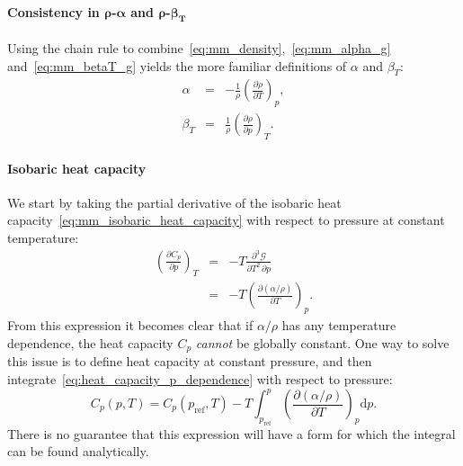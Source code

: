 \documentclass{article}
\begin{document}
\paragraph{Consistency in $\boldsymbol{\rho}$-$\boldsymbol{\alpha}$ and $\boldsymbol{\rho}$-$\boldsymbol{\beta_T}$}
Using the chain rule to combine~\eqref{eq:mm_density},~\eqref{eq:mm_alpha_g}
and~\eqref{eq:mm_betaT_g} yields the more familiar definitions of $\alpha$ and $\beta_T$:
\begin{eqnarray}
  \alpha &=& -\frac{1}{\rho} \left( \frac{\partial \rho}{\partial T} \right)_{p}, \label{eq:mm_thermal_expansivity} \\
  \beta_T &=& \frac{1}{\rho} \left( \frac{\partial \rho}{\partial p} \right)_{T}. \label{eq:mm_isothermal_compressibility}
\end{eqnarray}

\paragraph{Isobaric heat capacity}

We start by taking the partial derivative of the isobaric heat
capacity~\eqref{eq:mm_isobaric_heat_capacity} with respect to pressure at constant temperature:
\begin{eqnarray}
  \left( \frac{\partial C_p}{\partial p} \right)_{T} &=& -T \frac{\partial^3 \mathcal{G}}{\partial {T}^2 \, \partial {p}} \\
  &=& -T \left( \frac{\partial \left(\alpha / \rho \right)}{\partial T} \right)_{p}. \label{eq:heat_capacity_p_dependence}
\end{eqnarray}
From this expression it becomes clear that if $\alpha / \rho$ has any temperature dependence,
the heat capacity $C_p$ \emph{cannot} be globally constant. One way to solve this issue is to define
heat capacity at constant pressure, and then integrate~\eqref{eq:heat_capacity_p_dependence}
with respect to pressure:
\begin{equation}
  C_p(p, T)
  = C_p(p_{\textrm{ref}}, T) -T \int_{p_{\textrm{ref}}}^p
  \left(\frac{\partial \left(\alpha / \rho \right)}{\partial T} \right)_{p}
  \text{d}p.
\end{equation}
There is no guarantee that this expression will have a form for which the integral can be found analytically.
\end{document}
